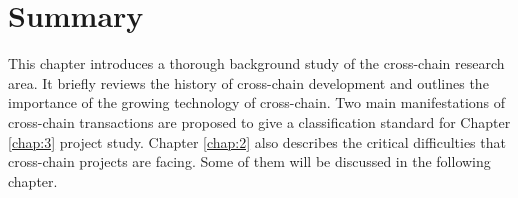%


\section{Summary}

\noindent This chapter introduces a thorough background study of the cross-chain research area. It briefly reviews the history of cross-chain development and outlines the importance of the growing technology of cross-chain. Two main manifestations of cross-chain transactions are proposed to give a classification standard for Chapter \ref{chap:3} project study. Chapter \ref{chap:2} also describes the critical difficulties that cross-chain projects are facing. Some of them will be discussed in the following chapter.
